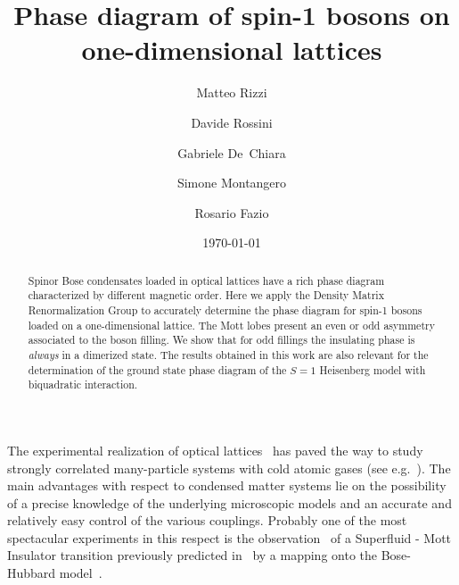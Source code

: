 \documentclass[prl,twocolumn,superscriptaddress,showpacs,floatfix]{revtex4}
\begin{document}
\title{Phase diagram of spin-1 bosons on one-dimensional lattices}

\author{Matteo Rizzi}

\author{Davide Rossini}

\author{Gabriele De~Chiara}

\author{Simone Montangero}

\author{Rosario Fazio}

\date{\today}

\begin{abstract}
Spinor Bose condensates loaded in optical lattices have a rich phase diagram
characterized by different magnetic order.
Here we apply the Density Matrix Renormalization Group to accurately determine
the phase diagram for spin-1 bosons loaded on a one-dimensional lattice.
The Mott lobes present an even or odd asymmetry associated
to the boson filling.
We show that for odd fillings the insulating phase is {\em always}
in a dimerized state. 
The results obtained in this work are also relevant for the determination
of the ground state phase diagram of the $S=1$ Heisenberg model
with biquadratic interaction. 
 
\end{abstract}


\maketitle

The experimental realization of optical lattices~\cite{general_experiments} has
paved the way to study strongly correlated many-particle systems with
cold atomic gases (see e.g.~\cite{jaksch05,minguzzi03}). The main advantages 
with respect to condensed matter systems lie on the possibility of a precise 
knowledge of the underlying microscopic models and an accurate and relatively 
easy control of the various couplings. Probably one of the most spectacular
experiments in this respect is the observation~\cite{greiner02} of
a Superfluid - Mott Insulator transition previously predicted
in~\cite{jaksch98} by a mapping onto the Bose-Hubbard model~\cite{fisher89}. 
\end{document}
